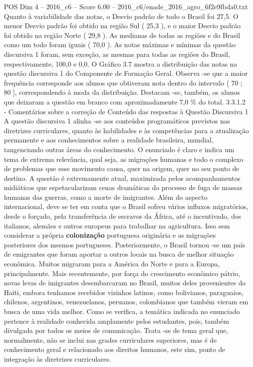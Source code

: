 \begin{textsample}{POS Dim 4 – 2016\_c6 – Score 6.00 – 2016\_c6/enade\_2016\_agro\_6f2e9fbda0.txt}
Quanto à variabilidade das notas, o Desvio padrão de todo o Brasil foi 27,5.
O menor Desvio padrão foi obtido na região Sul ( 25,3 ), e o maior Desvio padrão foi obtido na região Norte ( 29,8 ).
As medianas de todas as regiões e do Brasil como um todo foram iguais ( 70,0 ).
As notas máximas e mínimas da questão discursiva 1 foram, sem exceção, as mesmas para todas as regiões do Brasil, respectivamente, 100,0 e 0,0.
O Gráfico 3.7 mostra a distribuição das notas na questão discursiva 1 do Componente de Formação Geral.
Observa -se que a maior frequência corresponde aos alunos que obtiveram nota dentro do intervalo ( 70 ; 80 ], correspondendo à moda da distribuição.
Destacam -se, também, os alunos que deixaram a questão em branco com aproximadamente 7,0 \% do total. 3.3.1.2 - Comentários sobre a correção de Conteúdo das respostas à Questão Discursiva 1 A questão discursiva 1 alinha -se aos conteúdos programáticos previstos nas diretrizes curriculares, quanto às habilidades e às competências para a atualização permanente e aos conhecimentos sobre a realidade brasileira, mundial, tangenciando outras áreas do conhecimento.
O enunciado é claro e indica um tema de extrema relevância, qual seja, as migrações humanas e todo o complexo de problemas que esse movimento causa, quer na origem, quer no seu ponto de destino.
A questão é extremamente atual, maximizada pelos acompanhamentos midiáticos que espetacularizam cenas dramáticas do processo de fuga de massas humanas das guerras, como a morte de imigrantes.
Além do aspecto internacional, deve se ter em conta que o Brasil sofreu vários influxos migratórios, desde o forçado, pela transferência de escravos da África, até o incentivado, dos italianos, alemães e outros europeus para trabalhar na agricultura.
Isso sem considerar a própria \textbf{colonização} portuguesa originária e as migrações posteriores dos mesmos portugueses.
Posteriormente, o Brasil tornou -se um país de emigrantes que foram aportar a outros locais na busca de melhor situação econômica.
Muitos migraram para a América do Norte e para a Europa, principalmente.
Mais recentemente, por força do crescimento econômico pátrio, novas levas de imigrantes desembarcaram no Brasil, muitos deles provenientes do Haiti, embora tenhamos recebidos vizinhos latinos, como bolivianos, paraguaios, chilenos, argentinos, venezuelanos, peruanos, colombianos que também vieram em busca de uma vida melhor.
Como se verifica, a temática indicada no enunciado pertence à realidade conhecida amplamente pelos estudantes, pois, também divulgada por todos os meios de comunicação.
Trata -se de tema geral que, normalmente, não se inclui nas grades curriculares superiores, mas é de conhecimento geral e relacionado aos direitos humanos, este sim, ponto de integração às diretrizes curriculares.

\end{textsample}
